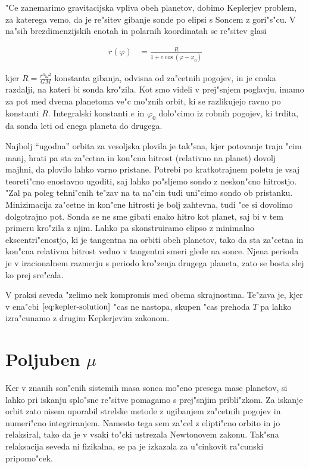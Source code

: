 \documentclass[a4paper,10pt]{article}
\renewcommand{\phi}{\varphi}
\begin{document}
"Ce zanemarimo gravitacijska vpliva obeh planetov, dobimo Keplerjev problem, za katerega vemo, da je re"sitev gibanje sonde po elipsi s Soncem z gori"s"cu. V na"sih brezdimenzijskih enotah in polarnih koordinatah se re"sitev glasi

\begin{align}
\label{eq:kepler-solution}
 r(\phi) &= \frac{R}{1 + e\cos (\phi - \phi_0)}
\end{align}

kjer $R = \frac{r^4\omega^2}{GM}$ konstanta gibanja, odvisna od za"cetnih pogojev, in je enaka razdalji, na kateri bi sonda kro"zila. Kot smo videli v prej"snjem poglavju, imamo za pot med dvema planetoma ve"c mo"znih orbit, ki se razlikujejo ravno po konstanti $R$. Integralski konstanti $e$ in $\phi_0$ dolo"cimo iz robnih pogojev, ki trdita, da sonda leti od enega planeta do drugega.

Najbolj ``ugodna'' orbita za vesoljska plovila je tak"sna, kjer potovanje traja "cim manj, hrati pa sta za"cetna in kon"cna hitrost (relativno na planet) dovolj majhni, da plovilo lahko varno pristane. Potrebi po kratkotrajnem poletu je vsaj teoreti"cno enostavno ugoditi, saj lahko po"sljemo sondo z neskon"cno hitrostjo. "Zal pa poleg tehni"cnih te"zav na ta na"cin tudi uni"cimo sondo ob pristanku. Minizimacija za"cetne in kon"cne hitrosti je bolj zahtevna, tudi "ce si dovolimo dolgotrajno pot. Sonda se ne sme gibati enako hitro kot planet, saj bi v tem primeru kro"zila z njim. Lahko pa skonstruiramo elipso z minimalno ekscentri"cnostjo, ki je tangentna na orbiti obeh planetov, tako da sta za"cetna in kon"cna relativna hitrost vedno v tangentni smeri glede na sonce. Njena perioda je v iracionalnem razmerju s periodo kro"zenja drugega planeta, zato se bosta slej ko prej sre"cala. 

V praksi seveda "zelimo nek kompromis med obema skrajnostma. Te"zava je, kjer v ena"cbi $\ref{eq:kepler-solution}$ "cas ne nastopa, skupen "cas prehoda $T$ pa lahko izra"cunamo z drugim Keplerjevim zakonom. 

\section{Poljuben $\mu$}

Ker v znanih son"cnih sistemih masa sonca mo"cno presega mase planetov, si lahko pri iskanju splo"sne re"sitve pomagamo s prej"snjim pribli"zkom. Za iskanje orbit zato nisem uporabil strelske metode z ugibanjem za"cetnih pogojev in numeri"cno integriranjem. Namesto tega sem za"cel z elipti"cno orbito in jo relaksiral, tako da je v vsaki to"cki ustrezala Newtonovem zakonu. Tak"sna relaksacija seveda ni fizikalna, se pa je izkazala za u"cinkovit ra"cunski pripomo"cek. 
\end{document}
